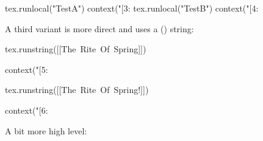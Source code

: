 \typebuffer[set][option=TEX]

\startbuffer[run]
\startluacode
tex.runlocal("TestA") context("[3: %
tex.runlocal("TestB") context("[4: %
\stopluacode
\stopbuffer

\typebuffer[run][option=TEX]

\start {} \stop

A third variant is more direct and uses a (\LUA) string:

\startbuffer[run]
\startluacode
tex.runstring([[\hbox{The Rite Of Spring}]])

context("[5: %

tex.runstring([[\hbox{The Rite Of Spring!}]])

context("[6: %
\stopluacode
\stopbuffer

\typebuffer[run][option=TEX]

\start \getbuffer[run] \stop

A bit more high level:

